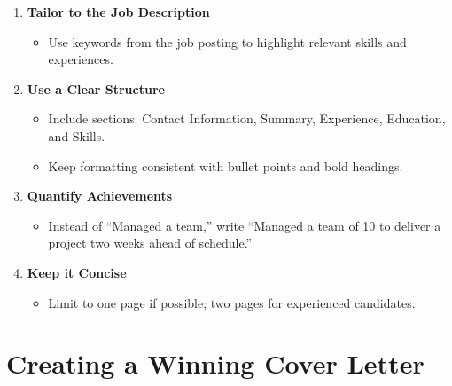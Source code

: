 \documentclass[
  letterpaper,
  DIV=11,
  numbers=noendperiod]{scrreprt}
\providecommand{\tightlist}{%
  \setlength{\itemsep}{0pt}\setlength{\parskip}{0pt}}\usepackage{longtable,booktabs,array}
\begin{document}
\begin{enumerate}
\def\labelenumi{\arabic{enumi}.}
\item
  \textbf{Tailor to the Job Description}

  \begin{itemize}
  \tightlist
  \item
    Use keywords from the job posting to highlight relevant skills and
    experiences.
  \end{itemize}
\item
  \textbf{Use a Clear Structure}

  \begin{itemize}
  \tightlist
  \item
    Include sections: Contact Information, Summary, Experience,
    Education, and Skills.
  \item
    Keep formatting consistent with bullet points and bold headings.
  \end{itemize}
\item
  \textbf{Quantify Achievements}

  \begin{itemize}
  \tightlist
  \item
    Instead of ``Managed a team,'' write ``Managed a team of 10 to
    deliver a project two weeks ahead of schedule.''
  \end{itemize}
\item
  \textbf{Keep it Concise}

  \begin{itemize}
  \tightlist
  \item
    Limit to one page if possible; two pages for experienced candidates.
  \end{itemize}
\end{enumerate}

\section{Creating a Winning Cover
Letter}\label{creating-a-winning-cover-letter}
\end{document}
